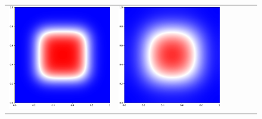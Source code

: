 \documentclass[12pt, reqno]{report}
\theoremstyle{definition}
\theoremstyle{remark}
\begin{document}
\begin{figure}[H]
\begin{tabular}{rccccc}
        \includegraphics[align = c, height=\subheight]{media_paper/cmap_FD_n=200.png} & 
        \includegraphics[align = c, height=\subheight]{media_paper/cmap_FD_n=500.png} & 

\end{tabular}
\end{figure}
\end{document}
